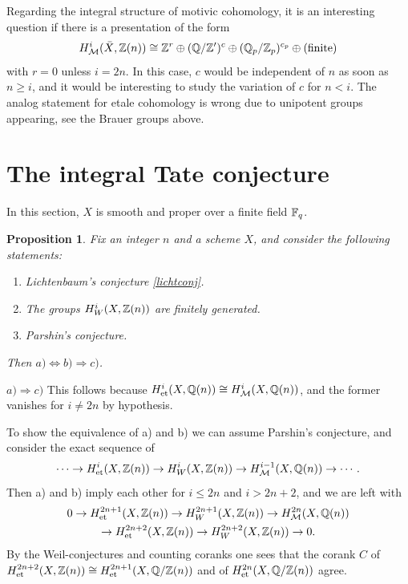 \documentclass[nospthms,envcountsect]{svmult} %
\newtheorem{proposition}[theorem]       {Proposition}
\begin{document}
Regarding the integral structure of motivic cohomology, it is 
an interesting question if there is a presentation of the form
$$ H^i_{\mathcal M}(\bar X,{{\mathbb Z}}(n))\cong 
{{\mathbb Z}}^r\oplus ({{\mathbb Q}}/{{\mathbb Z}}')^c\oplus ({{\mathbb Q}}_p/{{\mathbb Z}}_p)^{c_p} \oplus (\text{finite})$$
with $r=0$ unless $i=2n$. In this case, 
$c$ would be independent of $n$ as soon as $n\geq i$, and it 
would be interesting to study the variation of $c$ for $n<i$.
The analog statement for etale cohomology is wrong
due to unipotent groups appearing, see the Brauer groups
above.





\section{The integral Tate conjecture}
In this section, $X$ is smooth and proper over a finite field ${{\mathbb F}}_q$.

\begin{proposition} Fix an integer $n$ and a scheme $X$, and 
consider the following statements:
\begin{enumerate} 
\item Lichtenbaum's conjecture \ref{lichtconj}.
\item The groups $H^i_W(X,{{\mathbb Z}}(n))$ are finitely generated.
\item Parshin's conjecture.
\end{enumerate}
Then $a)\Leftrightarrow b) \Rightarrow c)$.
\end{proposition}

\proof
$a)\Rightarrow c)$ This follows because
$H^i_{\text{\rm et}}(X,{{\mathbb Q}}(n))\cong H^i_{\mathcal M}(X,{{\mathbb Q}}(n))$, and the former vanishes
for $i\not=2n$ by hypothesis.


To show the equivalence of a) and b) we can assume Parshin's
conjecture, and consider the exact sequence of \cite{ichweilI}
$$ \cdots \to H^i_{\text{\rm et}}(X,{{\mathbb Z}}(n))\to H^i_W(X,{{\mathbb Z}}(n))\to H^{i-1}_{\mathcal M}(X,{{\mathbb Q}}(n))\to \cdots.$$
Then a) and b) imply each other for $i\leq 2n$
and $i>2n+2$, and we are left with 
\begin{multline*} 
0\to H^{2n+1}_{\text{\rm et}}(X,{{\mathbb Z}}(n))\to H^{2n+1}_W(X,{{\mathbb Z}}(n))\to H^{2n}_{\mathcal M}(X,{{\mathbb Q}}(n))\\
\to H^{2n+2}_{\text{\rm et}}(X,{{\mathbb Z}}(n))\to H^{2n+2}_W(X,{{\mathbb Z}}(n))\to 0 .
\end{multline*}
By the Weil-conjectures and counting coranks one sees that the corank $C$
of $H^{2n+2}_{\text{\rm et}}(X,{{\mathbb Z}}(n))\cong H^{2n+1}_{\text{\rm et}}(X,{{\mathbb Q}}/{{\mathbb Z}}(n))$ and of 
$H^{2n}_{\text{\rm et}}(X,{{\mathbb Q}}/{{\mathbb Z}}(n))$ agree.
\end{document}
